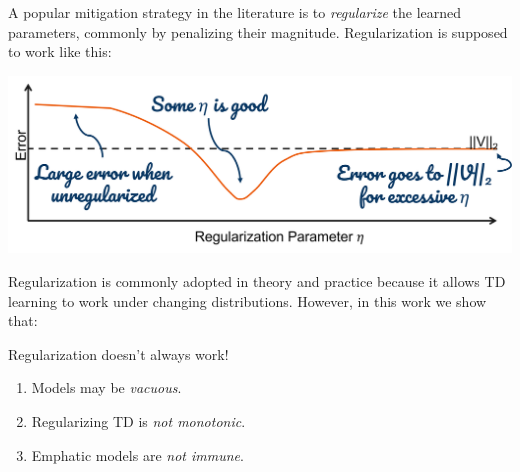 A popular mitigation strategy in the literature is to \emph{regularize} the learned parameters, commonly by penalizing their magnitude. Regularization is supposed to work like this:
\begin{center}
    \includegraphics[scale=0.4]{parts/intro/regworks}
\end{center}
Regularization is commonly adopted in theory and practice because it allows TD learning to work under changing distributions. However, in this work we show that:
\begin{mybox}
    {\headerfont Regularization doesn't always work!}
    \vspace{.5em}
    {\large
        \begin{enumerate}
            \item Models may be \emph{vacuous}.
            \item Regularizing TD is \emph{not monotonic}.
            \item Emphatic models are \emph{not immune}.
        \end{enumerate}
    }
    \vspace{.5em}
\end{mybox}